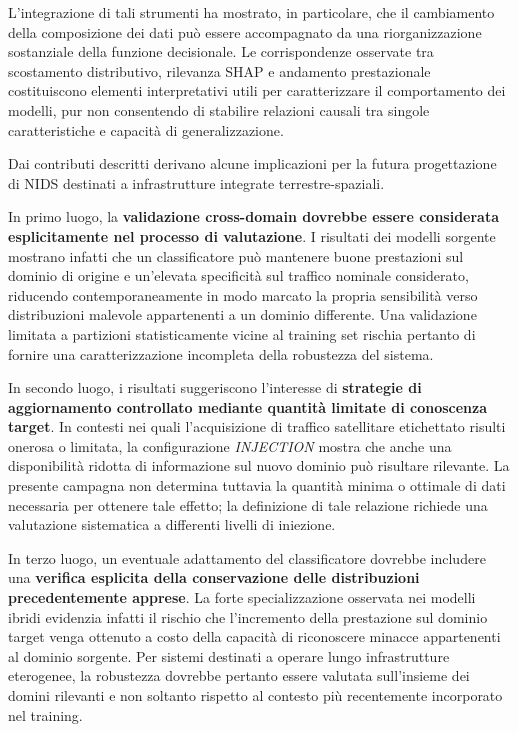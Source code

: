 L'integrazione di tali strumenti ha mostrato, in particolare, che il cambiamento della composizione dei dati può essere accompagnato da una riorganizzazione sostanziale della funzione decisionale.
Le corrispondenze osservate tra scostamento distributivo, rilevanza SHAP e andamento prestazionale costituiscono elementi interpretativi utili per caratterizzare il comportamento dei modelli, pur non consentendo di stabilire relazioni causali tra singole caratteristiche e capacità di generalizzazione.

Dai contributi descritti derivano alcune implicazioni per la futura progettazione di NIDS destinati a infrastrutture integrate terrestre-spaziali.

In primo luogo, la \textbf{validazione cross-domain dovrebbe essere considerata esplicitamente nel processo di valutazione}.
I risultati dei modelli sorgente mostrano infatti che un classificatore può mantenere buone prestazioni sul dominio di origine e un'elevata specificità sul traffico nominale considerato, riducendo contemporaneamente in modo marcato la propria sensibilità verso distribuzioni malevole appartenenti a un dominio differente.
Una validazione limitata a partizioni statisticamente vicine al training set rischia pertanto di fornire una caratterizzazione incompleta della robustezza del sistema.

In secondo luogo, i risultati suggeriscono l'interesse di \textbf{strategie di aggiornamento controllato mediante quantità limitate di conoscenza target}.
In contesti nei quali l'acquisizione di traffico satellitare etichettato risulti onerosa o limitata, la configurazione \textit{INJECTION} mostra che anche una disponibilità ridotta di informazione sul nuovo dominio può risultare rilevante.
La presente campagna non determina tuttavia la quantità minima o ottimale di dati necessaria per ottenere tale effetto; la definizione di tale relazione richiede una valutazione sistematica a differenti livelli di iniezione.

In terzo luogo, un eventuale adattamento del classificatore dovrebbe includere una \textbf{verifica esplicita della conservazione delle distribuzioni precedentemente apprese}.
La forte specializzazione osservata nei modelli ibridi evidenzia infatti il rischio che l'incremento della prestazione sul dominio target venga ottenuto a costo della capacità di riconoscere minacce appartenenti al dominio sorgente.
Per sistemi destinati a operare lungo infrastrutture eterogenee, la robustezza dovrebbe pertanto essere valutata sull'insieme dei domini rilevanti e non soltanto rispetto al contesto più recentemente incorporato nel training.

